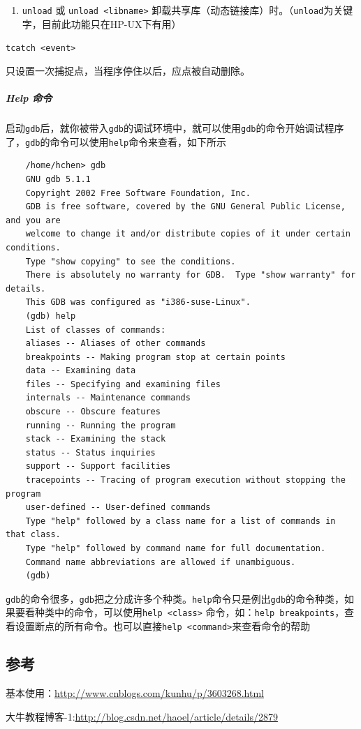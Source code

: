\documentclass[UTF8,a4paper,12pt]{ctexbook} %
\begin{document}
\begin{itemize}[itemindent = 1em]
\begin{enumerate}
						 		\item \verb|unload| 或 \verb|unload <libname>| 卸载共享库（动态链接库）时。（\verb|unload|为关键字，目前此功能只在HP-UX下有用）
						 	\end{enumerate}
						 	
						 	\verb|tcatch <event> |
						 	
						 	只设置一次捕捉点，当程序停住以后，应点被自动删除。
					 \end{itemize}
				\subparagraph{Help 命令}启动\verb|gdb|后，就你被带入\verb|gdb|的调试环境中，就可以使用\verb|gdb|的命令开始调试程序了，\verb|gdb|的命令可以使用\verb|help|命令来查看，如下所示
				
				\begin{lstlisting}
	/home/hchen> gdb
	GNU gdb 5.1.1
	Copyright 2002 Free Software Foundation, Inc.
	GDB is free software, covered by the GNU General Public License, and you are
	welcome to change it and/or distribute copies of it under certain conditions.
	Type "show copying" to see the conditions.
	There is absolutely no warranty for GDB.  Type "show warranty" for details.
	This GDB was configured as "i386-suse-Linux".
	(gdb) help
	List of classes of commands:
	aliases -- Aliases of other commands
	breakpoints -- Making program stop at certain points
	data -- Examining data
	files -- Specifying and examining files
	internals -- Maintenance commands
	obscure -- Obscure features
	running -- Running the program
	stack -- Examining the stack
	status -- Status inquiries
	support -- Support facilities
	tracepoints -- Tracing of program execution without stopping the program
	user-defined -- User-defined commands
	Type "help" followed by a class name for a list of commands in that class.
	Type "help" followed by command name for full documentation.
	Command name abbreviations are allowed if unambiguous.
	(gdb)	
				\end{lstlisting}
				
			 \verb|gdb|的命令很多，\verb|gdb|把之分成许多个种类。\verb|help|命令只是例出\verb|gdb|的命令种类，如果要看种类中的命令，可以使用\verb|help <class>| 命令，如：\verb|help breakpoints|，查看设置断点的所有命令。也可以直接\verb|help <command>|来查看命令的帮助
		\subsection{参考}
			基本使用：\url{http://www.cnblogs.com/kunhu/p/3603268.html}
			
			大牛教程博客-1:\url{http://blog.csdn.net/haoel/article/details/2879}
			
\end{document}
